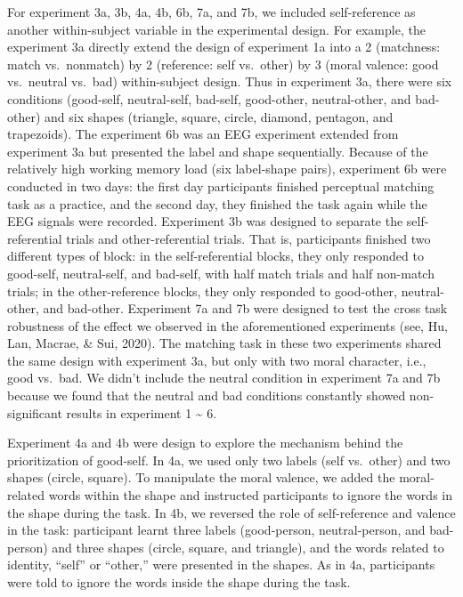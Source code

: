 \documentclass[
  english,
  man]{apa6}
\begin{document}
For experiment 3a, 3b, 4a, 4b, 6b, 7a, and 7b, we included self-reference as another within-subject variable in the experimental design. For example, the experiment 3a directly extend the design of experiment 1a into a 2 (matchness: match vs.~nonmatch) by 2 (reference: self vs.~other) by 3 (moral valence: good vs.~neutral vs.~bad) within-subject design. Thus in experiment 3a, there were six conditions (good-self, neutral-self, bad-self, good-other, neutral-other, and bad-other) and six shapes (triangle, square, circle, diamond, pentagon, and trapezoids). The experiment 6b was an EEG experiment extended from experiment 3a but presented the label and shape sequentially. Because of the relatively high working memory load (six label-shape pairs), experiment 6b were conducted in two days: the first day participants finished perceptual matching task as a practice, and the second day, they finished the task again while the EEG signals were recorded. Experiment 3b was designed to separate the self-referential trials and other-referential trials. That is, participants finished two different types of block: in the self-referential blocks, they only responded to good-self, neutral-self, and bad-self, with half match trials and half non-match trials; in the other-reference blocks, they only responded to good-other, neutral-other, and bad-other. Experiment 7a and 7b were designed to test the cross task robustness of the effect we observed in the aforementioned experiments (see, Hu, Lan, Macrae, \& Sui, 2020). The matching task in these two experiments shared the same design with experiment 3a, but only with two moral character, i.e., good vs.~bad. We didn't include the neutral condition in experiment 7a and 7b because we found that the neutral and bad conditions constantly showed non-significant results in experiment 1 \textasciitilde{} 6.

Experiment 4a and 4b were design to explore the mechanism behind the prioritization of good-self. In 4a, we used only two labels (self vs.~other) and two shapes (circle, square). To manipulate the moral valence, we added the moral-related words within the shape and instructed participants to ignore the words in the shape during the task. In 4b, we reversed the role of self-reference and valence in the task: participant learnt three labels (good-person, neutral-person, and bad-person) and three shapes (circle, square, and triangle), and the words related to identity, ``self'' or ``other,'' were presented in the shapes. As in 4a, participants were told to ignore the words inside the shape during the task.
\end{document}
